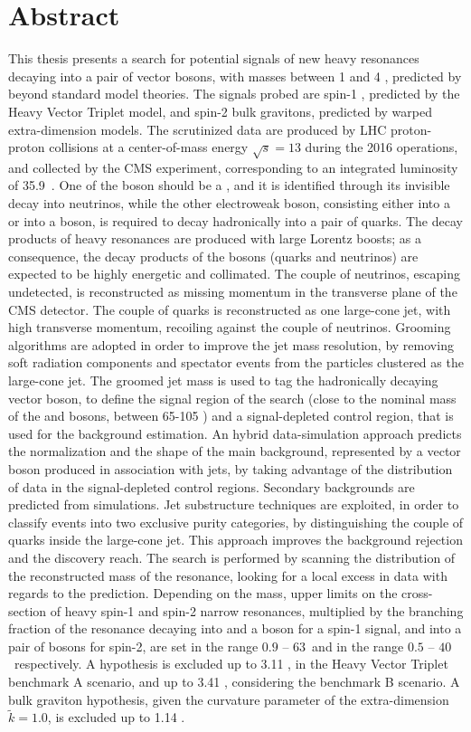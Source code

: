 \chapter*{Abstract}
\label{ch:abstract}

This thesis presents a search for potential signals of new heavy resonances decaying into a pair of vector bosons, with masses between 1 \TeV and 4 \TeV, predicted by beyond standard model theories. The signals probed are spin-1 \Wp, predicted by the Heavy Vector Triplet model, and spin-2 bulk gravitons, predicted by warped extra-dimension models. The scrutinized data are produced by LHC proton-proton collisions at a center-of-mass energy $\sqrt{s}=13$ \TeV during the 2016 operations, and collected by the CMS experiment, corresponding to an integrated luminosity of 35.9~\fbinv. One of the boson should be a \Z, and it is identified through its invisible decay into neutrinos, while the other electroweak boson, consisting either into a \W or into a \Z boson, is required to decay hadronically into a pair of quarks. The decay products of heavy resonances are produced with large Lorentz boosts; as a consequence, the decay products of the bosons (quarks and neutrinos) are expected to be highly energetic and collimated. The couple of neutrinos, escaping undetected, is reconstructed as missing momentum in the transverse plane of the CMS detector. The couple of quarks is reconstructed as one large-cone jet, with high transverse momentum, recoiling against the couple of neutrinos. Grooming algorithms are adopted in order to improve the jet mass resolution, by removing soft radiation components and spectator events from the particles clustered as the large-cone jet. The groomed jet mass is used to tag the hadronically decaying vector boson, to define the signal region of the search (close to the nominal mass of the \W and \Z bosons, between 65-105 \GeV) and a signal-depleted control region, that is used for the background estimation. An hybrid data-simulation approach predicts the normalization and the shape of the main background, represented by a vector boson produced in association with jets, by taking advantage of the distribution of data in the signal-depleted control regions. Secondary backgrounds are predicted from simulations. Jet substructure techniques are exploited, in order to classify events into two exclusive purity categories, by distinguishing the couple of quarks inside the large-cone jet. This approach improves the background rejection and the discovery reach. The search is performed by scanning the distribution of the reconstructed mass of the resonance, looking for a local excess in data with regards to the prediction. Depending on the mass, upper limits on the cross-section of heavy spin-1 and spin-2 narrow resonances, multiplied by the branching fraction of the resonance decaying into \Z and a \W boson for a spin-1 signal, and into a pair of \Z bosons for spin-2, are set in the range $0.9$ -- $63$~\fb and in the range $0.5$ -- $40$~\fb respectively. A \Wp hypothesis is excluded up to 3.11 \TeV, in the Heavy Vector Triplet benchmark A scenario, and up to 3.41 \TeV, considering the benchmark B scenario. A bulk graviton hypothesis, given the curvature parameter of the extra-dimension $\tilde{k}=1.0$, is excluded up to 1.14 \TeV.


\clearpage

